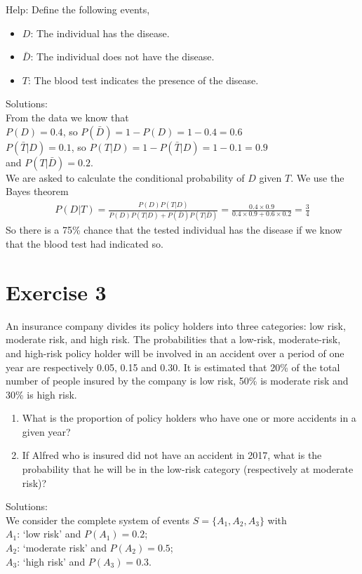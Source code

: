 \documentclass[12pt,thmsa]{article}\usepackage[]{graphicx}\usepackage[]{color}
\begin{document}
Help: Define the following events,
\begin{itemize}
\item $ D $: The individual has the disease.
\item $ \bar{D} $: The individual does not have the disease.
\item $ T $: The blood test indicates the presence of the disease.
\end{itemize}

\noindent Solutions:\\

\noindent From the data we know that \\
$ P(D)=0.4 $, so $ P(\bar{D})=1-P(D)=1-0.4=0.6 $\\
$ P(\bar{T} | D)=0.1 $, so $P(T|D)=1- P(\bar{T} | D)=1-0.1=0.9$\\
and $ P(T | \bar{D})=0.2 $. \\
We are asked to calculate the conditional probability of $D $ given $T $.  We use the Bayes theorem
\begin{align*}
P(D|T)=\frac{P(D)P(T|D)}{P(D)P(T|D)+P(\bar{D})P(T|\bar{D})}=\frac{0.4\times0.9}{0.4\times0.9+0.6\times0.2}=\frac{3}{4}
\end{align*}
So there is a 75\% chance that the tested individual has the disease if we know that the blood test had indicated so.


\section*{Exercise 3}

An insurance company divides its policy holders into three categories: low risk, moderate risk, and high risk. The probabilities that a low-risk, moderate-risk, and high-risk policy holder will be involved in an accident over a period of one year are respectively 0.05, 0.15 and 0.30. It is estimated that 20\% of the total number of people insured by the company is low risk, 50\% is moderate risk and 30\% is high risk.

\begin{enumerate}
	\item What is the proportion of policy holders who have one or more accidents in a given year?
	\item If Alfred who is insured did not have an accident in 2017, what is the probability that he will be in the low-risk category (respectively at moderate risk)?
\end{enumerate}

\noindent Solutions:\\
\noindent We consider the complete system of events $S=\{A_{1}, A_{2},A_{3}\}$ with\\
$A_{1}$: `low risk' and $P(A_{1})=0.2$;\\
$A_{2}$: `moderate risk' and  $P(A_{2})=0.5$;\\
$A_{3}$: `high risk' and $ P(A_{3})=0.3$.
\end{document}
